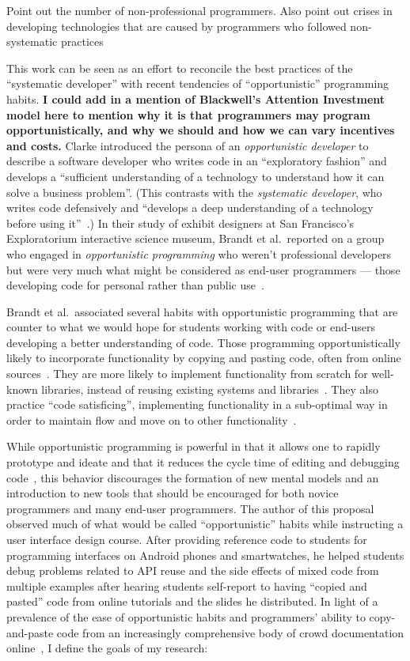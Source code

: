 \documentclass[12pt]{memoir}
\begin{document}
Point out the number of non-professional programmers.
Also point out crises in developing technologies that are caused by programmers who followed non-systematic practices

This work can be seen as an effort to reconcile the best practices of the ``systematic developer'' with recent tendencies of ``opportunistic'' programming habits.
\textbf{I could add in a mention of Blackwell's Attention Investment model here to mention why it is that programmers may program opportunistically, and why we should and how we can vary incentives and costs.}
Clarke introduced the persona of an \emph{opportunistic developer} to describe a software developer who writes code in an ``exploratory fashion'' and develops a ``sufficient understanding of a technology to understand how it can solve a business problem''.
(This contrasts with the \emph{systematic developer}, who writes code defensively and ``develops a deep understanding of a technology before using it''~\cite{clarke_what_2007}.)
In their study of exhibit designers at San Francisco's Exploratorium interactive science museum, Brandt et al.\ reported on a group who engaged in \emph{opportunistic programming} who weren't professional developers~\cite{brandt_opportunistic_2008} but were very much what might be considered as end-user programmers --- those developing code for personal rather than public use~\cite{ko_state_2011}.

Brandt et al.\ associated several habits with opportunistic programming that are counter to what we would hope for students working with code or end-users developing a better understanding of code.
Those programming opportunistically likely to incorporate functionality by copying and pasting code, often from online sources~\cite{brandt_two_2009}.
They are more likely to implement functionality from scratch for well-known libraries, instead of reusing existing systems and libraries~\cite{brandt_opportunistic_2008}.
They also practice ``code satisficing'', implementing functionality in a sub-optimal way in order to maintain flow and move on to other functionality~\cite{brandt_opportunistic_2008}.

While opportunistic programming is powerful in that it allows one to rapidly prototype and ideate and that it reduces the cycle time of editing and debugging code~\cite{brandt_opportunistic_2008}, this behavior discourages the formation of new mental models and an introduction to new tools that should be encouraged for both novice programmers and many end-user programmers.
The author of this proposal observed much of what would be called ``opportunistic'' habits while instructing a user interface design course.
After providing reference code to students for programming interfaces on Android phones and smartwatches, he helped students debug problems related to API reuse and the side effects of mixed code from multiple examples after hearing students self-report to having ``copied and pasted'' code from online tutorials and the slides he distributed.
In light of a prevalence of the ease of opportunistic habits and programmers' ability to copy-and-paste code from an increasingly comprehensive body of crowd documentation online~\cite{parnin_crowd_2012}, I define the goals of my research:
\end{document}
